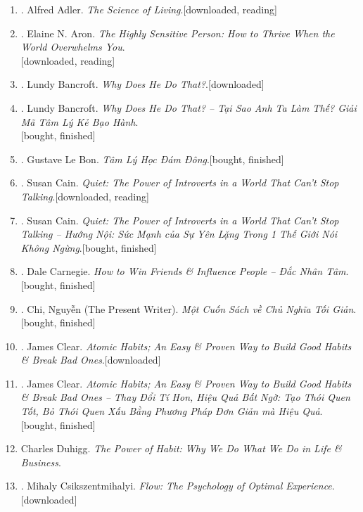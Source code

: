 \documentclass{article}
\begin{document}
\begin{enumerate}
	\item \cite{Adler2013}. Alfred Adler. \textit{The Science of Living}.\hfill\textsf{[downloaded, reading]}
	\item \cite{Aron2013}. Elaine N. Aron. \textit{The Highly Sensitive Person: How to Thrive When the World Overwhelms You}.\\\mbox{}\hfill\textsf{[downloaded, reading]}
	\item \cite{Bancroft2003}. Lundy Bancroft. \textit{Why Does He Do That?}.\hfill\textsf{[downloaded]}
	\item \cite{Bancroft2019}. Lundy Bancroft. \textit{Why Does He Do That? -- Tại Sao Anh Ta Làm Thế? Giải Mã Tâm Lý Kẻ Bạo Hành}.\\\mbox{}\hfill\textsf{[bought, finished]}
	\item \cite{Bon2022}. Gustave Le Bon. \textit{Tâm Lý Học Đám Đông}.\hfill\textsf{[bought, finished]}
	\item \cite{Cain2013}. Susan Cain. \textit{Quiet: The Power of Introverts in a World That Can't Stop Talking}.\hfill\textsf{[downloaded, reading]}
	\item \cite{Cain2022}. Susan Cain. \textit{Quiet: The Power of Introverts in a World That Can't Stop Talking -- Hướng Nội: Sức Mạnh của Sự Yên Lặng Trong 1 Thế Giới Nói Không Ngừng}.\hfill\textsf{[bought, finished]}
	\item \cite{Carnegie2021}. Dale Carnegie. \textit{How to Win Friends \& Influence People -- Đắc Nhân Tâm}.\hfill\textsf{[bought, finished]}
	\item \cite{Chi2022}. Chi, Nguyễn (The Present Writer). \textit{Một Cuốn Sách về Chủ Nghĩa Tối Giản}. \hfill\textsf{[bought, finished]}
	\item \cite{Clear2018}. James Clear. \textit{Atomic Habits; An Easy \& Proven Way to Build Good Habits \& Break Bad Ones}.\hfill\textsf{[downloaded]}
	\item \cite{Clear2022}. James Clear. \textit{Atomic Habits; An Easy \& Proven Way to Build Good Habits \& Break Bad Ones -- Thay Đổi Tí Hon, Hiệu Quả Bất Ngờ: Tạo Thói Quen Tốt, Bỏ Thói Quen Xấu Bằng Phương Pháp Đơn Giản mà Hiệu Quả}.\\\mbox{}\hfill\textsf{[bought, finished]}
	\item Charles Duhigg. \textit{The Power of Habit: Why We Do What We Do in Life \& Business}.
	\item \cite{Csikszentmihalyi2008}. Mihaly Csikszentmihalyi. \textit{Flow: The Psychology of Optimal Experience}.\hfill\textsf{[downloaded]}

\end{enumerate}
\end{document}
